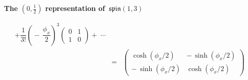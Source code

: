 \begin{frame}{\headingColor\bf\LARGE The $\left(0,\frac{1}{2}\right)$ representation of \,$\mathfrak{spin}(1,3)$}
\begin{itemize}
\begin{eqnarray*}
		+ \dfrac{1}{3!}\left(\!-\,\dfrac{\phi_{x}}{2}\!\right)^{\!3}\left(\!\!\begin{array}{cc} 0 & 1 \\ 1 & 0 \end{array}\!\!\!\right)
		+ \;\cdots
	\\
	& = &
		\left(\!\!\begin{array}{rr} \cosh(\phi_{x}/2) & -\,\sinh(\phi_{x}/2) \\ -\,\sinh(\phi_{x}/2) & \cosh(\phi_{x}/2) \end{array}\!\!\!\right)
	\end{eqnarray*}
\end{itemize}

\end{frame}
\normalsize

